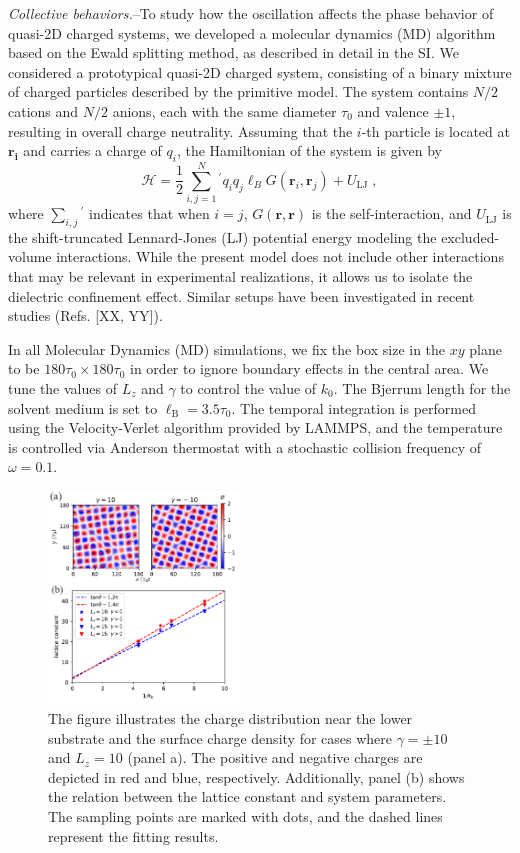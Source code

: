 \documentclass[aps,prl,reprint,showpacs,floatfix,superscriptaddress]{revtex4-2}
\newcommand{\V}[1]{\boldsymbol{#1}} %
\begin{document}
\textit{Collective behaviors.}--To study how the oscillation affects the phase behavior of quasi-2D charged systems, we developed a molecular dynamics (MD) algorithm based on the Ewald splitting method, as described in detail in the SI.
We considered a prototypical quasi-2D charged system, consisting of a binary mixture of charged particles described by the primitive model.
The system contains $N/2$ cations and $N/2$ anions, each with the same diameter $\tau_0$ and valence $\pm 1$, resulting in overall charge neutrality.
Assuming that the $i$-th particle is located at $\V{r_i}$ and carries a charge of $q_i$, the Hamiltonian of the system is given by
\begin{equation}
    \mathcal H = \frac{1}{2} \sum_{i,j=1}^{N}{}^\prime q_i q_j \ell_B G(\V r_i, \V r_j) + U_{\mathrm{LJ}}\;,\label{eq:Hamiltonian}
 \end{equation}
where $\sum_{i,j}{}^\prime$ indicates that when $i=j$, $G(\V r, \V r)$ is the self-interaction, and $U_{\mathrm{LJ}}$ is the shift-truncated Lennard-Jones (LJ) potential energy modeling the excluded-volume interactions.
While the present model does not include other interactions that may be relevant in experimental realizations, it allows us to isolate the dielectric confinement effect.
Similar setups have been investigated in recent studies (Refs. [XX, YY]).

In all Molecular Dynamics (MD) simulations, we fix the box size in the $xy$ plane to be $180\tau_0\times 180\tau_0$ in order to ignore boundary effects in the central area. We tune the values of $L_z$ and $\gamma$ to control the value of $k_0$. The Bjerrum length for the solvent medium is set to $\ell_{\mathrm B} = 3.5 \tau_0$. The temporal integration is performed using the Velocity-Verlet algorithm provided by LAMMPS, and the temperature is controlled via Anderson thermostat with a stochastic collision frequency of $\omega = 0.1$.

\begin{figure}
	\centering
	\includegraphics[width=0.45\textwidth]{figs/fig3.pdf}
	\caption{\label{fig:MD} 
        The figure illustrates the charge distribution near the lower substrate and the surface charge density for cases where $\gamma = \pm 10$ and $L_z = 10$ (panel a).
        The positive and negative charges are depicted in red and blue, respectively. 
        Additionally, panel (b) shows the relation between the lattice constant and system parameters. 
        The sampling points are marked with dots, and the dashed lines represent the fitting results.
	}
\end{figure}
\end{document}
